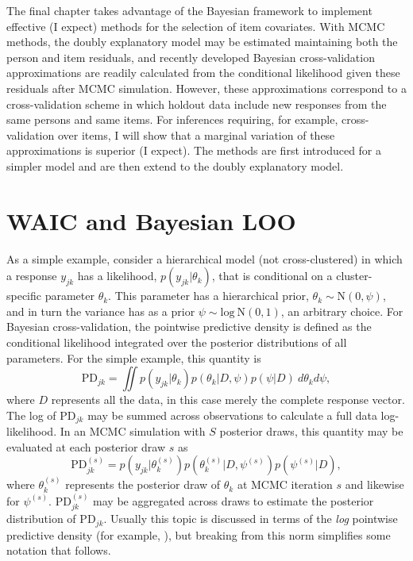 The final chapter takes advantage of the Bayesian framework to implement effective (I expect) methods for the selection of item covariates. 
With MCMC methods, the doubly explanatory model may be estimated maintaining both the person and item residuals, and recently developed Bayesian cross-validation approximations are readily calculated from the conditional likelihood given these residuals after MCMC simulation. 
However, these approximations correspond to a cross-validation scheme in which holdout data include new responses from the same persons and same items. 
For inferences requiring, for example, cross-validation over items, I will show that a marginal variation of these approximations is superior (I expect).
The methods are first introduced for a simpler model and are then extend to the doubly explanatory model.


\section{WAIC and Bayesian LOO}

As a simple example, consider a hierarchical model (not cross-clustered) in which a response $y_{jk}$ has a likelihood, 
$p(y_{jk} | \theta_k)$, 
that is conditional on a cluster-specific parameter $\theta_k$. This parameter has a hierarchical prior,
$\theta_k \sim \mathrm{N}(0, \psi)$, and in turn the variance has as a prior
$\psi \sim \mathrm{log~N}(0, 1)$, an arbitrary choice. For Bayesian cross-validation, the pointwise predictive density is defined as the conditional likelihood integrated over the posterior distributions of all parameters. For the simple example, this quantity is
\begin{equation} 
	\mathrm{PD}_{jk} = 
	\iint
		p(y_{jk} | \theta_k)
		p(\theta_k | D, \psi)
		p(\psi | D)
	~d \theta_k d \psi
,\end{equation}
where $D$ represents all the data, in this case merely the complete response vector.
The log of $\mathrm{PD}_{jk}$ may be summed across observations to calculate a full data log-likelihood.
In an MCMC simulation with $S$ posterior draws, this quantity may be evaluated at each posterior draw $s$ as
\begin{equation} 
	\mathrm{PD}_{jk}^{(s)} = 
	p(y_{jk} | \theta_k^{(s)})
	p(\theta_k^{(s)} | D, \psi^{(s)})
	p(\psi^{(s)} | D)
,\end{equation}
where $\theta_k^{(s)}$ represents the posterior draw of $\theta_k$ at MCMC iteration $s$ and likewise for $\psi^{(s)}$.
$\mathrm{PD}_{jk}^{(s)}$ may be aggregated across draws to estimate the posterior distribution of $\mathrm{PD}_{jk}$. Usually this topic is discussed in terms of the \emph{log} pointwise predictive density (for example, \cite{gelman2014understanding}), but breaking from this norm simplifies some notation that follows.

